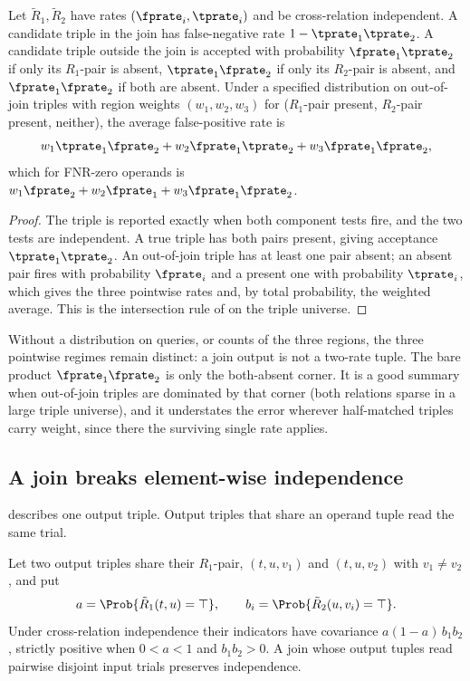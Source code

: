 \begin{theorem}
\label{thm:join-rates}
Let $\tilde R_1, \tilde R_2$ have rates $(\fprate_i, \tprate_i)$ and be
cross-relation independent. A candidate triple in the join has false-negative
rate $1 - \tprate_1 \tprate_2$. A candidate triple outside the join is accepted
with probability $\fprate_1 \tprate_2$ if only its $R_1$-pair is absent,
$\tprate_1 \fprate_2$ if only its $R_2$-pair is absent, and $\fprate_1 \fprate_2$
if both are absent. Under a specified distribution on out-of-join triples with
region weights $(w_1, w_2, w_3)$ for ($R_1$-pair present, $R_2$-pair present,
neither), the average false-positive rate is
\[
  w_1 \tprate_1 \fprate_2 + w_2 \fprate_1 \tprate_2 + w_3 \fprate_1 \fprate_2,
\]
which for FNR-zero operands is $w_1 \fprate_2 + w_2 \fprate_1 + w_3 \fprate_1
\fprate_2$.
\end{theorem}

\begin{proof}
The triple is reported exactly when both component tests fire, and the two tests
are independent. A true triple has both pairs present, giving acceptance
$\tprate_1 \tprate_2$. An out-of-join triple has at least one pair absent; an
absent pair fires with probability $\fprate_i$ and a present one with probability
$\tprate_i$, which gives the three pointwise rates and, by total probability, the
weighted average. This is the intersection rule of 
on the triple universe.
\end{proof}

Without a distribution on queries, or counts of the three regions, the three
pointwise regimes remain distinct: a join output is not a two-rate tuple. The bare
product $\fprate_1 \fprate_2$ is only the both-absent corner. It is a good summary
when out-of-join triples are dominated by that corner (both relations sparse in a
large triple universe), and it understates the error wherever half-matched triples
carry weight, since there the surviving single rate applies.

\subsection*{A join breaks element-wise independence}

 describes one output triple. Output triples that share an
operand tuple read the same trial.

\begin{theorem}
\label{thm:join-correlation}
Let two output triples share their $R_1$-pair, $(t, u, v_1)$ and $(t, u, v_2)$
with $v_1 \ne v_2$, and put
\[
  a = \Prob{\tilde R_1(t, u) = \top},
  \qquad
  b_i = \Prob{\tilde R_2(u, v_i) = \top}.
\]
Under cross-relation independence their indicators have covariance $a(1 - a)\,
b_1 b_2$, strictly positive when $0 < a < 1$ and $b_1 b_2 > 0$. A join whose output tuples
read pairwise disjoint input trials preserves independence.
\end{theorem}

